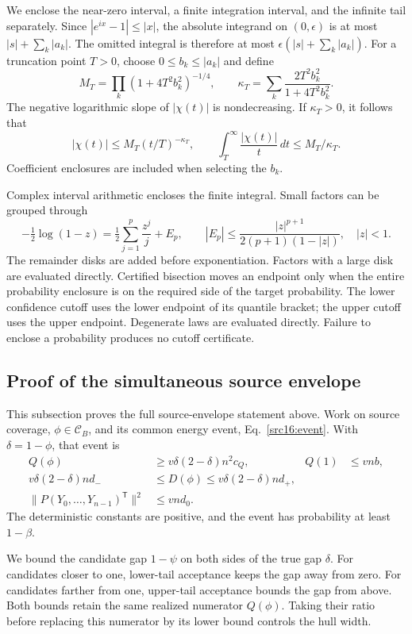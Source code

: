 We enclose the near-zero interval, a finite integration interval, and the infinite tail separately. Since $|e^{ix}-1|\le|x|$, the absolute integrand on $(0,\epsilon)$ is at most $|s|+\sum_k|a_k|$. The omitted integral is therefore at most $\epsilon(|s|+\sum_k|a_k|)$. For a truncation point $T>0$, choose $0\le b_k\le|a_k|$ and define
\begin{equation}\label{src16:si-tail}
 M_T=\prod_k(1+4T^2b_k^2)^{-1/4},\qquad
 \kappa_T=\sum_k\frac{2T^2b_k^2}{1+4T^2b_k^2}.
\end{equation}
The negative logarithmic slope of $|\chi(t)|$ is nondecreasing. If $\kappa_T>0$, it follows that
\[
 |\chi(t)|\le M_T(t/T)^{-\kappa_T},\qquad
 \int_T^\infty\frac{|\chi(t)|}{t}\,dt\le M_T/\kappa_T.
\]
Coefficient enclosures are included when selecting the $b_k$.

Complex interval arithmetic encloses the finite integral. Small factors can be grouped through
\[
 -\tfrac12\log(1-z)=\tfrac12\sum_{j=1}^{p}\frac{z^j}{j}+E_p,
 \qquad |E_p|\le\frac{|z|^{p+1}}{2(p+1)(1-|z|)},\quad |z|<1.
\]
The remainder disks are added before exponentiation. Factors with a large disk are evaluated directly. Certified bisection moves an endpoint only when the entire probability enclosure is on the required side of the target probability. The lower confidence cutoff uses the lower endpoint of its quantile bracket; the upper cutoff uses the upper endpoint. Degenerate laws are evaluated directly. Failure to enclose a probability produces no cutoff certificate.

\subsection{Proof of the simultaneous source envelope}\label{src16:si-envelope}
This subsection proves the full source-envelope statement above. Work on source coverage, $\phi\in\mathcal C_B$, and its common energy event, Eq.~\eqref{src16:event}. With $\delta=1-\phi$, that event is
\[
\begin{aligned}
 Q(\phi)&\ge v\delta(2-\delta)n^2c_Q, & Q(1)&\le vnb,\\
 v\delta(2-\delta)nd_-&\le D(\phi)\le v\delta(2-\delta)nd_+,\\
 \|P(Y_0,\ldots,Y_{n-1})^{\mathsf T}\|^2&\le vnd_0.
\end{aligned}
\]
The deterministic constants are positive, and the event has probability at least $1-\beta$.

We bound the candidate gap $1-\psi$ on both sides of the true gap $\delta$. For candidates closer to one, lower-tail acceptance keeps the gap away from zero. For candidates farther from one, upper-tail acceptance bounds the gap from above. Both bounds retain the same realized numerator $Q(\phi)$. Taking their ratio before replacing this numerator by its lower bound controls the hull width.


